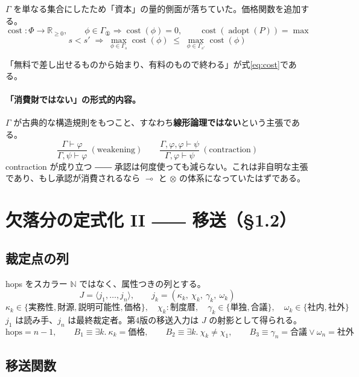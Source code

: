 \documentclass[11pt,a4paper]{article}
\newcommand{\adopt}{\operatorname{adopt}}
\newcommand{\cost}{\operatorname{cost}}
\begin{document}
$\Gamma$ を単なる集合にしたため「資本」の量的側面が落ちていた。価格関数を追加する。
\[
\cost : \Phi \to \mathbb{R}_{\geq 0}, \qquad
\phi \in \Gamma_{①} \Rightarrow \cost(\phi) = 0, \qquad
\cost(\adopt(P)) = \max
\]
\begin{equation}\label{eq:cost}
s < s' \;\Longrightarrow\; \max_{\phi \in \Gamma_{s}} \cost(\phi) \;\leq\; \max_{\phi \in \Gamma_{s'}} \cost(\phi)
\end{equation}

「無料で差し出せるものから始まり、有料のもので終わる」が式\eqref{eq:cost}である。

\paragraph{「消費財ではない」の形式的内容。}$\Gamma$ が古典的な構造規則をもつこと、すなわち\textbf{線形論理ではない}という主張である。
\[
\frac{\Gamma \vdash \varphi}{\Gamma, \psi \vdash \varphi}\ (\text{weakening})
\qquad
\frac{\Gamma, \varphi, \varphi \vdash \psi}{\Gamma, \varphi \vdash \psi}\ (\text{contraction})
\]
contraction が成り立つ ―― 承認は何度使っても減らない。これは非自明な主張であり、もし承認が消費されるなら $\multimap$ と $\otimes$ の体系になっていたはずである。

\section{欠落分の定式化 II ―― 移送（§1.2）}

\subsection{裁定点の列}

hops をスカラー $\mathbb{N}$ ではなく、属性つきの列とする。
\[
J = \langle j_1, \dots, j_n \rangle, \qquad
j_k = (\kappa_k,\ \chi_k,\ \gamma_k,\ \omega_k)
\]
\[
\kappa_k \in \{\text{実務性},\text{財源},\text{説明可能性},\text{価格}\},\quad
\chi_k : \text{制度暦},\quad
\gamma_k \in \{\text{単独},\text{合議}\},\quad
\omega_k \in \{\text{社内},\text{社外}\}
\]
$j_1$ は読み手、$j_n$ は最終裁定者。第4版の移送入力は $J$ の射影として得られる。
\[
\text{hops} = n - 1,\qquad
B_1 \equiv \exists k.\ \kappa_k = \text{価格},\qquad
B_2 \equiv \exists k.\ \chi_k \neq \chi_1,\qquad
B_3 \equiv \gamma_n = \text{合議} \vee \omega_n = \text{社外}
\]

\subsection{移送関数}
\end{document}
